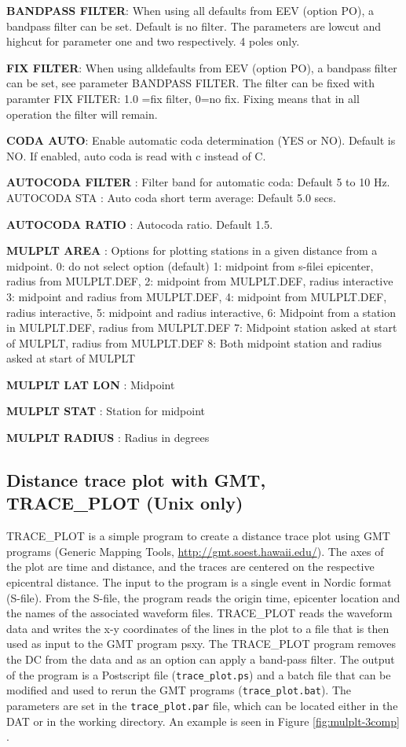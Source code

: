 \textbf{BANDPASS FILTER}: When using all 
defaults from EEV (option PO), a bandpass filter can be set. Default is no filter. The parameters are 
lowcut and highcut for parameter one and two respectively. 4 poles only. 

\textbf{FIX FILTER}: When using alldefaults from EEV (option PO), a bandpass filter can be set, see parameter BANDPASS FILTER. The filter can be fixed with paramter FIX FILTER: 1.0 =fix filter, 0=no fix. Fixing means that in all operation the filter will remain.

\textbf{CODA AUTO}: Enable automatic coda determination (YES or NO). Default is NO. If enabled, auto coda is read with c instead of C. 

\textbf{AUTOCODA FILTER }: Filter band for automatic coda: Default 5 to 10 Hz. AUTOCODA STA : Auto coda short term average: Default 5.0 secs. 

\textbf{AUTOCODA RATIO }: Autocoda ratio. Default 1.5.

\textbf{MULPLT AREA }: Options for plotting stations in a given distance from a midpoint. 0: do not select option (default) 1: midpoint from s-filei epicenter, radius from MULPLT.DEF,  2: midpoint from MULPLT.DEF, radius interactive  3: midpoint and radius from MULPLT.DEF, 4: midpoint from MULPLT.DEF, radius interactive, 5: midpoint and radius interactive, 6: Midpoint from a station in MULPLT.DEF, radius from MULPLT.DEF
7: Midpoint station asked at start of MULPLT, radius from MULPLT.DEF
8: Both midpoint station and radius asked at start of MULPLT


\textbf{MULPLT LAT LON }: Midpoint 

\textbf{MULPLT STAT }: Station for midpoint 

\textbf{MULPLT RADIUS }: Radius in degrees 

\subsection{Distance trace plot with GMT, TRACE\_PLOT (Unix only)}
TRACE\_PLOT is a simple program to create a distance trace plot using GMT programs (Generic Mapping Tools, \url{http://gmt.soest.hawaii.edu/}). The axes of the plot are time and distance, and the traces are centered on the respective epicentral distance. The input to the program is a single event in Nordic format (S-file). From the S-file, the program reads the origin time, epicenter location and the names of the associated waveform files. TRACE\_PLOT reads the waveform data and writes the x-y coordinates of the lines in the plot to a file that is then used as input to the GMT program psxy. The TRACE\_PLOT program removes the DC from the data and as an option can apply a band-pass filter. The output of the program is a Postscript file (\texttt{trace\_plot.ps}) and a batch file that can be modified and used to rerun the GMT programs (\texttt{trace\_plot.bat}). The parameters are set in the \texttt{trace\_plot.par} file, which can be located either in the DAT or in the working directory. An example is seen in Figure 
\ref{fig:mulplt-3comp}
. 

